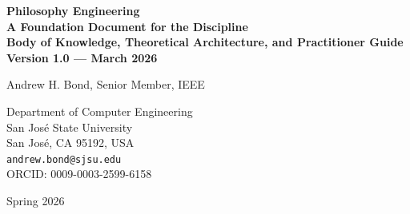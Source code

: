 \documentclass[12pt,letterpaper]{article}
\theoremstyle{definition}
\theoremstyle{plain}
\begin{document}
\begin{titlepage}
\centering
\vspace*{2cm}

{\LARGE\bfseries Philosophy Engineering\\[0.8em]
\Large A Foundation Document for the Discipline\\[0.5em]
\large Body of Knowledge, Theoretical Architecture, and Practitioner Guide\\[1em]
\normalsize Version 1.0 --- March 2026}

\vspace{1.5cm}

{\Large Andrew H. Bond, Senior Member, IEEE}

\vspace{0.5cm}

{\large
Department of Computer Engineering\\
San Jos\'e State University\\
San Jos\'e, CA 95192, USA\\[0.3cm]
\texttt{andrew.bond@sjsu.edu}\\[0.3cm]
ORCID: 0009-0003-2599-6158
}

\vspace{1cm}

{\large Spring 2026}

\vspace{2cm}


\end{titlepage}
\end{document}
